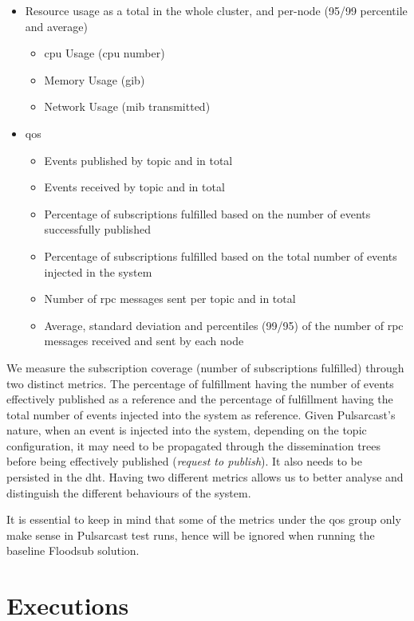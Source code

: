 \begin{itemize}
  \item Resource usage as a total in the whole cluster, and per-node (95/99
  percentile and average)
  \begin{itemize}
    \item \acrshort{cpu} Usage (\acrshort{cpu} number)
    \item Memory Usage (\acrshort{gib})
    \item Network Usage (\acrshort{mib} transmitted)
  \end{itemize}
  \item \acrshort{qos}
  \begin{itemize}
    \item Events published by topic and in total
    \item Events received by topic and in total
    \item Percentage of subscriptions fulfilled based on the number of events
    successfully published
    \item Percentage of subscriptions fulfilled based on the total number of events
    injected in the system
    \item Number of \acrshort{rpc} messages sent per topic and in total
    \item Average, standard deviation and percentiles (99/95) of the number of \acrshort{rpc} messages received and sent by each node
  \end{itemize}
\end{itemize}

We measure the subscription coverage (number of subscriptions fulfilled)
through two distinct metrics. The percentage of fulfillment having the number
of events effectively published as a reference and the percentage of
fulfillment having the total number of events injected into the system as
reference. Given Pulsarcast's nature, when an event is injected into the
system, depending on the topic configuration, it may need to be propagated
through the dissemination trees before being effectively published
(\emph{request to publish}). It also needs to be persisted in the
\acrshort{dht}. Having two different metrics allows us to better analyse and
distinguish the different behaviours of the system.

It is essential to keep in mind that some of the metrics under the \acrshort{qos} group
only make sense in Pulsarcast test runs, hence will be ignored when running the
baseline Floodsub solution.

\section{Executions}\label{executions}

